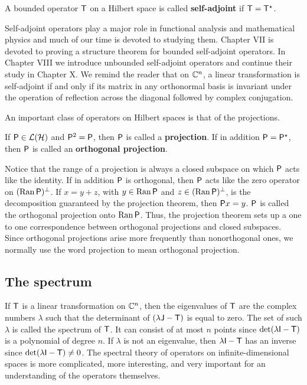 \begin{definition}
    A bounded operator $\mathsf{T}$ on a Hilbert space is called \textbf{self-adjoint} if $\mathsf{T} = \mathsf{T}^\star$.
\end{definition}

Self-adjoint operators play a major role in functional analysis and mathematical physics and much of our time is devoted to studying them. Chapter VII is devoted to proving a structure theorem for bounded self-adjoint operators. In Chapter VIII we introduce unbounded self-adjoint operators and continue their study in Chapter X. We remind the reader that on $\mathbb{C}^n$, a linear transformation is self-adjoint if and only if its matrix in any orthonormal basis is invariant under the operation of reflection across the diagonal followed by complex conjugation.

An important class of operators on Hilbert spaces is that of the projections.

\begin{definition}
    If $\mathsf{P} \in \mathcal L(\mathcal{H})$ and $\mathsf{P}^2 = \mathsf{P}$, then $\mathsf{P}$ is called a \textbf{projection}. If in addition $\mathsf{P} = \mathsf{P}^\star$, then $\mathsf{P}$ is called an \textbf{orthogonal projection}.
\end{definition}

Notice that the range of a projection is always a closed subspace on which $\mathsf{P}$ acts like the identity. If in addition $\mathsf{P}$ is orthogonal, then $\mathsf{P}$ acts like the zero operator on $(\mathrm{Ran}\, \mathsf{P})^\bot$. If $x = y + z$, with $y \in \mathrm{Ran}\, \mathsf{P}$ and $z \in (\mathrm{Ran}\, \mathsf{P})^\bot$, is the decomposition guaranteed by the projection theorem, then $\mathsf{P} x =y$. $\mathsf{P}$ is called the orthogonal projection onto $\mathrm{Ran}\, \mathsf{P}$. Thus, the projection theorem sets up a one to one correspondence between orthogonal projections and closed subspaces. Since orthogonal projections arise more frequently than nonorthogonal ones, we normally use the word projection to mean orthogonal projection.

\subsection{The spectrum}

If $\mathsf{T}$ is a linear transformation on $\mathbb{C}^n$, then the eigenvalues of $\mathsf{T}$ are the complex numbers $\lambda$ 
such that the determinant of $( \lambda \mathsf{J} - \mathsf{T} )$ is equal to zero. 
The set of such $\lambda$ is called the spectrum of $\mathsf{T}$. It can consist of at most $n$ points since $\det (\lambda \mathsf{I} - \mathsf{T})$ is a polynomial of degree $n$. If $\lambda$ is not an eigenvalue, then $\lambda \mathsf{I} - \mathsf{T}$ has an inverse since $\det (\lambda \mathsf{I} - \mathsf{T}) \neq 0$.
The spectral theory of operators on infinite-dimensional spaces is more complicated, more interesting, and very important for an understanding of the operators themselves.

